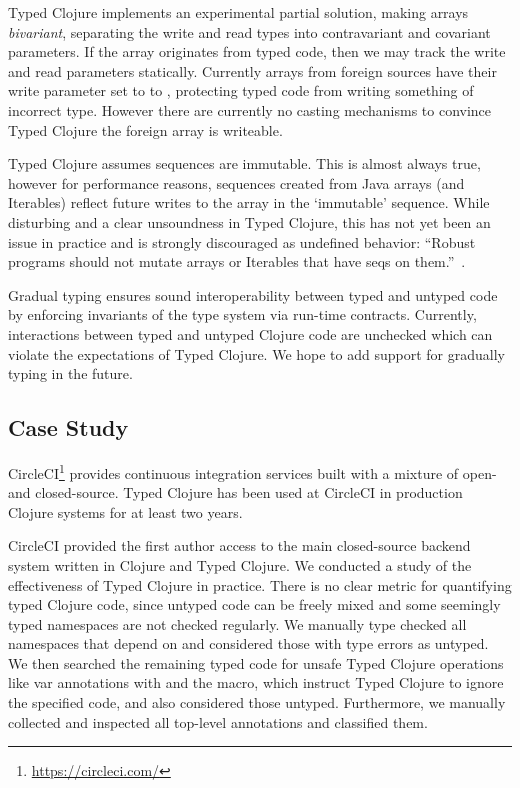 Typed Clojure implements an experimental partial solution, making arrays \emph{bivariant},
separating the write and read types into contravariant and covariant parameters.
If the array originates from typed code, then we may track the write and read
parameters statically. Currently arrays from foreign sources
have their write parameter set to to \Bot{}, protecting typed code from writing
something of incorrect type. However there are currently no casting mechanisms to 
convince Typed Clojure the foreign array is writeable.

Typed Clojure assumes sequences are immutable. This is almost always true, however
for performance reasons,
sequences created from Java arrays (and Iterables) reflect future writes to the array 
in the `immutable' sequence. While disturbing and a clear unsoundness in Typed Clojure,
this has not yet been an issue in practice and is strongly discouraged as undefined behavior:
``Robust programs should not mutate arrays or Iterables that have seqs on them.''~\cite{CljSeqDoc}.

Gradual typing ensures sound interoperability between typed and untyped code by enforcing
invariants of the type system via run-time contracts.
Currently, interactions between typed and untyped Clojure code are unchecked
which can violate the expectations of Typed Clojure. We hope to add support
for gradually typing in the future.

\subsection{Case Study}
\label{sec:casestudy}

CircleCI\footnote{\url{https://circleci.com/}} provides continuous integration services built with a mixture of open-
and closed-source.
Typed Clojure has been used at CircleCI in production Clojure systems for at least two years.

CircleCI provided the first author access to the main closed-source backend system written in Clojure
and Typed Clojure.
We conducted a study of the effectiveness of Typed Clojure in practice.
There is no clear metric for quantifying typed Clojure code, since untyped code
can be freely mixed and some seemingly typed namespaces are not checked
regularly. We manually type checked all namespaces that depend on 
and considered those with type errors as untyped.
We then searched the remaining typed code for unsafe Typed Clojure operations like
var annotations with  and the  macro,
which instruct Typed Clojure to ignore the specified code,
and also considered those untyped.
Furthermore, we manually collected and inspected all top-level annotations and
classified them.

